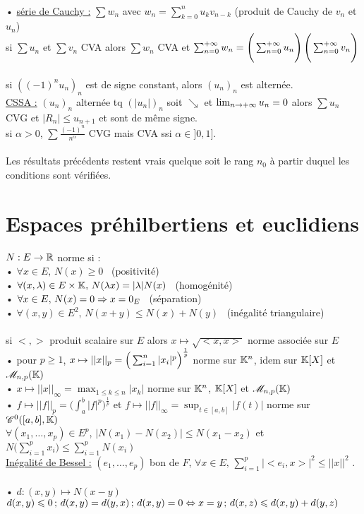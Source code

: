 \documentclass[12 pt]{book}
\begin{document}
\newpage
\text{}\\
• \underline{série de Cauchy :} $\sum w_n$ avec $w_n = \sum_{k=0}^n u_k v_{n-k}$ (produit de Cauchy de $v_n$ et $u_n$)\\
si $\sum u_n$ et $\sum v_n$ CVA alors $\sum w_n$ CVA et $\sum_{n=0}^{+\infty} w_n = \Bigg(\sum_{n=0}^{+\infty} u_n\Bigg) \, \Bigg( \sum_{n=0}^{+\infty} v_n \Bigg)$\\
\text{}\\
si $((-1)^n u_n)_n$ est de signe constant, alors $(u_n)_n$ est alternée.\\ 
\underline{CSSA :} $(u_n)_n$ alternée tq $(|u_n|)_n$ soit $\searrow$ et $\lim_{n\to +\infty} u_n = 0$ alors $\sum u_n$ CVG et $|R_n| \leqslant u_{n+1}$ et sont de même signe.\\
si $\alpha > 0$, $\sum \frac{(-1)^n}{n^\alpha}$ CVG mais CVA ssi $\alpha \in ]0,1]$.\\
\text{}\\
Les résultats précédents restent vrais quelque soit le rang $n_0$ à partir duquel les conditions sont vérifiées.\\

\section*{Espaces préhilbertiens et euclidiens}
$N : E \to \mathbb{R}$ norme si :\\
• $\forall x\in E,\, N(x)\geqslant 0$ \ (positivité)\\
• $\forall (x,\lambda)\in E\times \mathbb{K},\, N(\lambda x) = |\lambda| N(x)$ \ (homogénité)\\
• $\forall x\in E,\, N(x) = 0 \Rightarrow x=0_E$ \ (séparation)\\
• $\forall (x,y)\in E^2,\, N(x+y)\leqslant N(x) + N(y)$ \ (inégalité triangulaire)\\
\text{}\\
si $<, >$ produit scalaire sur $E$ alors $x \mapsto \sqrt{<x, x>}$ norme associée sur $E$\\
• pour $p\geqslant 1$, $x\mapsto || x ||_p = \Big( \sum_{i=1}^n |x_i|^p \Big)^{\frac{1}{p}}$ \; norme sur $\mathbb{K}^n$, idem sur $\mathbb{K}[X]$ et $\mathscr{M}_{n,p}(\mathbb{K})$\\
• $x\mapsto || x ||_\infty = \max_{1\leqslant k \leqslant n} { |x_k|}$ norme sur $\mathbb{K}^n$, $\mathbb{K}[X]$ et $\mathscr{M}_{n,p}(\mathbb{K})$\\
• $f \mapsto ||f||_p = \Big( \int_a^b |f|^p \Big)^{\frac{1}{p}}$ et $f \mapsto ||f||_\infty = \sup_{t\in[a,b]} |f(t)|$ norme sur $\mathscr{C}^0([a,b],\mathbb{K})$\\
$\forall (x_1,\dots, x_p)\in E^p$, $|N(x_1) - N(x_2)| \leqslant N(x_1 - x_2)$ \; et \; $N\Big(\sum_{i=1}^p x_i \Big) \leqslant \sum_{i=1}^p N(x_i)$\\
\underline{Inégalité de Bessel :} $(e_1,\dots, e_p)$ bon de $F$, $\forall x\in E, \, \sum_{i =1}^p |<e_i,x>|^2 \leqslant ||x||^2$ .\\
\text{}\\
• $d : (x,y) \mapsto N(x-y)$\\
$d(x,y) \leqslant 0 \, ; \, d(x,y) = d(y,x) \, ; \, d(x,y)=0 \Leftrightarrow x=y \, ; \, d(x,z)\leqslant d(x,y) + d(y,z)$\\
\end{document}
